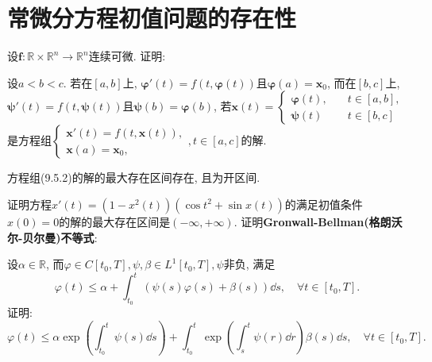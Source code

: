 \section{常微分方程初值问题的存在性}
\begin{quiza}
\woe 设\(\boldsymbol{f}:\mathbb{R}\times \mathbb{R}^n\rightarrow\mathbb{R}^n\)连续可微. 证明:\begin{quizs}
\item 设\(a<b<c\). 若在\([a,b]\)上, \(\boldsymbol{\varphi}'(t)=f\left(t,\boldsymbol{\varphi}(t)\right)\)且\(\boldsymbol{\varphi}(a)=\boldsymbol{x}_0\), 而在\([b,c]\)上, \(\boldsymbol{\psi'}(t)=f\left(t,\boldsymbol{\psi}(t)\right)\)且\(\boldsymbol{\psi}(b)=\boldsymbol{\varphi}(b)\), 若\(\boldsymbol{x}(t)=\begin{cases}
\boldsymbol{\varphi}(t),\quad &t\in[a,b],\\
\boldsymbol{\psi}(t)&t\in[b,c]
\end{cases}\)是方程组\(\begin{cases}
\boldsymbol{x}'(t)=f(t,\boldsymbol{x}(t)),\\
\boldsymbol{x}(a)=\boldsymbol{x}_0,
\end{cases},t\in[a,c]\)的解.
\item 方程组(9.5.2)的解的最大存在区间存在, 且为开区间.
\end{quizs}
\woe 证明方程\(x'(t)=\left(1-x^2(t)\right)\left(\cos t^2+\sin x(t)\right)\)的满足初值条件\(x(0)=0\)的解的最大存在区间是\((-\infty,+\infty)\).
\woe 证明\textbf{Gronwall-Bellman(格朗沃尔-贝尔曼)不等式}:

设\(\alpha\in\mathbb{R}\), 而\(\varphi\in C[t_0,T],\psi,\beta\in L^1[t_0,T], \psi\)非负, 满足\[\varphi(t)\leqslant\alpha+\int_{t_0}^{t}\left(\psi(s)\varphi(s)+\beta(s)\right)\dd s,\quad\forall t\in[t_0,T].\]证明:\[\varphi(t)\leqslant\alpha\exp\left(\int_{t_0}^{t}\psi(s)\dd s\right)+\int_{t_0}^{t}\exp\left(\int_{s}^{t}\psi(r)\dd r\right)\beta(s)\dd s,\quad\forall t\in[t_0,T].\]


\end{quiza}
